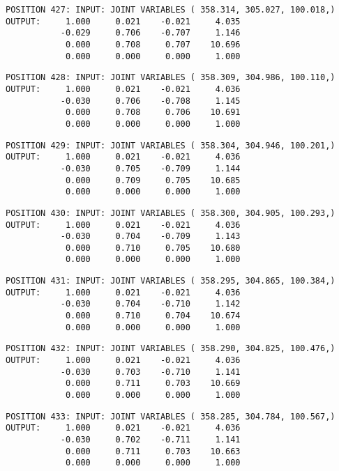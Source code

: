 \begin{verbatim}
POSITION 427: INPUT: JOINT VARIABLES ( 358.314, 305.027, 100.018,)
OUTPUT:     1.000     0.021    -0.021     4.035
           -0.029     0.706    -0.707     1.146
            0.000     0.708     0.707    10.696
            0.000     0.000     0.000     1.000
\end{verbatim} \pagebreak[1]\begin{verbatim}
POSITION 428: INPUT: JOINT VARIABLES ( 358.309, 304.986, 100.110,)
OUTPUT:     1.000     0.021    -0.021     4.036
           -0.030     0.706    -0.708     1.145
            0.000     0.708     0.706    10.691
            0.000     0.000     0.000     1.000
\end{verbatim} \pagebreak[1]\begin{verbatim}
POSITION 429: INPUT: JOINT VARIABLES ( 358.304, 304.946, 100.201,)
OUTPUT:     1.000     0.021    -0.021     4.036
           -0.030     0.705    -0.709     1.144
            0.000     0.709     0.705    10.685
            0.000     0.000     0.000     1.000
\end{verbatim} \pagebreak[1]\begin{verbatim}
POSITION 430: INPUT: JOINT VARIABLES ( 358.300, 304.905, 100.293,)
OUTPUT:     1.000     0.021    -0.021     4.036
           -0.030     0.704    -0.709     1.143
            0.000     0.710     0.705    10.680
            0.000     0.000     0.000     1.000
\end{verbatim} \pagebreak[1]\begin{verbatim}
POSITION 431: INPUT: JOINT VARIABLES ( 358.295, 304.865, 100.384,)
OUTPUT:     1.000     0.021    -0.021     4.036
           -0.030     0.704    -0.710     1.142
            0.000     0.710     0.704    10.674
            0.000     0.000     0.000     1.000
\end{verbatim} \pagebreak[1]\begin{verbatim}
POSITION 432: INPUT: JOINT VARIABLES ( 358.290, 304.825, 100.476,)
OUTPUT:     1.000     0.021    -0.021     4.036
           -0.030     0.703    -0.710     1.141
            0.000     0.711     0.703    10.669
            0.000     0.000     0.000     1.000
\end{verbatim} \pagebreak[1]\begin{verbatim}
POSITION 433: INPUT: JOINT VARIABLES ( 358.285, 304.784, 100.567,)
OUTPUT:     1.000     0.021    -0.021     4.036
           -0.030     0.702    -0.711     1.141
            0.000     0.711     0.703    10.663
            0.000     0.000     0.000     1.000
\end{verbatim} \pagebreak[1]\begin{verbatim}

\end{verbatim}
